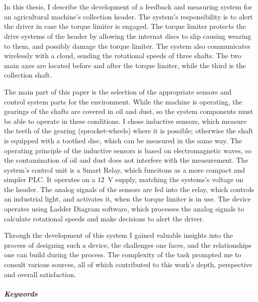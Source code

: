 \chapter*{\summary}

\selectforeignlanguage %

In this thesis, I describe the development of a feedback and measuring system for an agricultural machine's collection header. The system's responsibility is to alert the driver in case the torque limiter is engaged. The torque limiter protects the drive systems of the header by allowing the internat discs to slip causing wearing to them, and possibly damage the torque limiter. The system also communicates wirelessly with a cloud, sending the rotational speeds of three shafts. The two main axes are located before and after the torque limiter, while the third is the collection shaft.

The main part of this paper is the selection of the appropriate sensors and control system parts for the environment. While the machine is operating, the gearings of the shafts are covered in oil and dust, so the system components must be able to operate in these conditions. I chose inductive sensors, which measure the teeth of the gearing (sprocket-wheels) where it is possible; otherwise the shaft is equipped with a toothed disc, which can be measured in the same way. The operating principle of the inductive sensors is based on electromagnetic waves, so the contamination of oil and dust does not interfere with the measurement. The system's control unit is a Smart Relay, which funcitons as a more compact and simpler PLC. It operates on a $12$~V supply, matching the systems's voltage on the header. The analog signals of the sensors are fed into the relay, which controls an industrial light, and activates it, when the torque limiter is in use. The device operates using Ladder Diagram software, which processes the analog signals to calculate rotational speeds and make decisions to alert the driver.

Through the development of this system I gained valuable insights into the process of designing such a device, the challenges one faces, and the relationships one can build during the process. The complexity of the task prompted me to consult various sources, all of which contributed to this work's depth, perspective and overall satisfaction.

\vspace{0.5cm}
\paragraph{Keywords} \emph{\keywords}  %


\selectthesislanguage %
